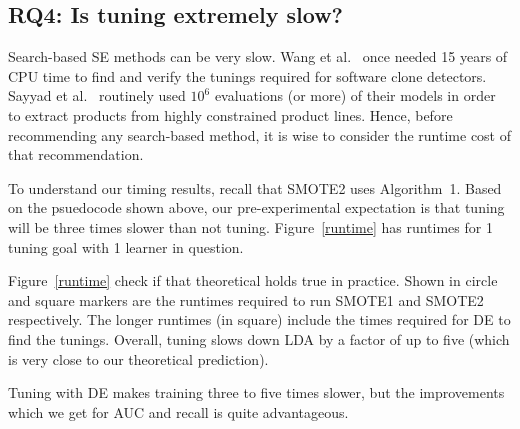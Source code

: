 \subsection{\textbf{RQ4: Is tuning extremely slow?}}

Search-based SE methods can be very slow. Wang et al.~\cite{wang2013searching} once needed 15
years of CPU time to find and verify the tunings required for software
clone detectors. Sayyad et al.~\cite{sayyad2013scalable} routinely used
$10^6$ evaluations (or more) of their models in order to extract
products from highly constrained product
lines. Hence, before recommending any
search-based method, it is wise to consider the runtime cost of that
recommendation.

To understand our timing results, recall that SMOTE2 uses
Algorithm~1. Based on the psuedocode
shown above, our pre-experimental expectation is that
tuning will be three times slower than not tuning. Figure~\ref{runtime} has runtimes for 1 tuning goal with 1 learner in question.
 
Figure~\ref{runtime} check if that theoretical
holds true in practice. Shown in circle and square markers are the
  runtimes required to run SMOTE1 and SMOTE2 respectively.  The
  longer runtimes (in square) include the times required for DE to find
  the tunings. Overall, tuning slows down LDA by a factor of up to
  five (which is very close to our theoretical prediction).

\begin{lesson}
    Tuning with DE makes training three to five times slower, but the improvements which we get for AUC and recall is quite advantageous.
\end{lesson}
